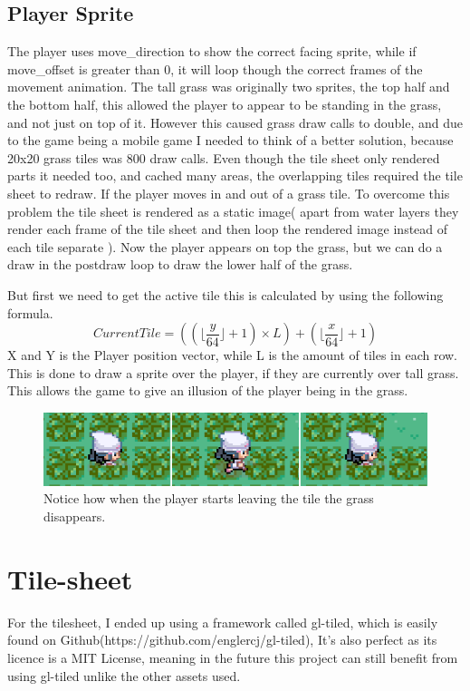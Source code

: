 \documentclass[11pt,a4paper]{article}
\begin{document}
\subsection{Player Sprite}
The player uses move\_direction to show the correct facing sprite, while if move\_offset is greater than 0, it will loop though the correct frames of the movement animation. The tall grass was originally two sprites, the top half and the bottom half, this allowed the player to appear to be standing in the grass, and not just on top of it. However this caused grass draw calls to double, and due to the game being a mobile game I needed to think of a better solution, because 20x20 grass tiles was 800 draw calls. Even though the tile sheet only rendered parts it needed too, and cached many areas, the overlapping tiles required the tile sheet to redraw. If the player moves in and out of a grass tile. To overcome this problem the tile sheet is rendered as a static image( apart from water layers they render each frame of the tile sheet and then loop the rendered image instead of each tile separate ). Now the player appears on top the grass, but we can do a draw in the postdraw loop to draw the lower half of the grass.

But first we need to get the active tile this is calculated by using the following formula. 
$$CurrentTile =((\lfloor\frac{y}{64}\rfloor + 1)\times L) +(\lfloor\frac{x}{64}\rfloor + 1)$$
X and Y is the Player position vector, while L is the amount of tiles in each row. This is done to draw a sprite over the player, if they are currently over tall grass. This allows the game to give an illusion of the player being in the grass.
\begin{figure}[h]
\caption{Notice how when the player starts leaving the tile the grass disappears.}
\centering
\includegraphics[width=1\textwidth]{grass_walk.png}
\end{figure}

\section{Tile-sheet} 
For the tilesheet, I ended up using a framework called gl-tiled, which is easily found on Github(https://github.com/englercj/gl-tiled), It's also perfect as its licence is a MIT License, meaning in the future this project can still benefit from using gl-tiled unlike the other assets used.
\end{document}

